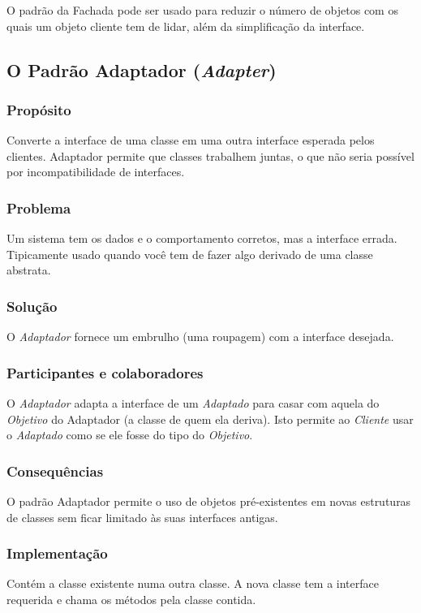\documentclass[
	11pt,				%
	openright,
	twoside,			%
	a4paper,			%
	english,			%
	french,
	brazil,				%
	sumario=tradicional
	]{abntex2}
\begin{document}
O padrão da Fachada pode ser usado para reduzir o número de objetos com os quais um objeto cliente tem de lidar, além da simplificação da interface.

\subsection{O Padrão Adaptador (\textit{Adapter})}
\subsubsection{Propósito}
Converte a interface de uma classe em uma outra interface esperada pelos clientes. Adaptador permite que classes trabalhem juntas, o que não seria possível por incompatibilidade de interfaces.
 
\subsubsection{Problema}
Um sistema tem os dados e o comportamento corretos, mas a interface errada. Tipicamente usado quando você tem de fazer algo derivado de uma classe abstrata.

\subsubsection{Solução}
O \emph{Adaptador} fornece um embrulho (uma roupagem) com a interface desejada.

\subsubsection{Participantes e colaboradores}
O \emph{Adaptador} adapta a interface de um \emph{Adaptado} para casar com aquela do \emph{Objetivo} do Adaptador (a classe de quem ela deriva). Isto permite ao \emph{Cliente} usar o \emph{Adaptado} como se ele fosse do tipo do \emph{Objetivo}.

\subsubsection{Consequências}
O padrão Adaptador permite o uso de objetos pré-existentes em novas estruturas de classes sem ficar limitado às suas interfaces antigas.

\subsubsection{Implementação}
Contém a classe existente numa outra classe. A nova classe tem a interface requerida e chama os métodos pela classe contida.
\end{document}
